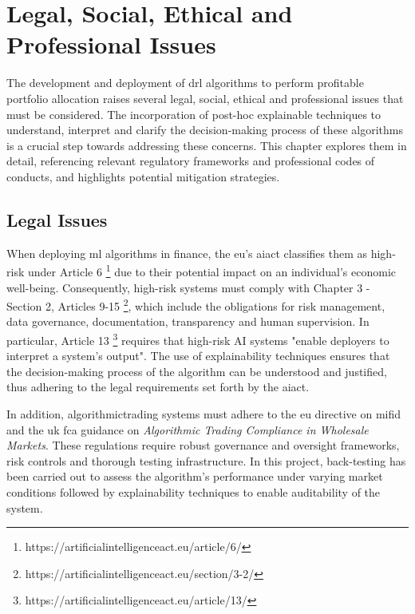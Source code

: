 \chapter{Legal, Social, Ethical and Professional Issues} \label{ch:issues}

The development and deployment of \acrfull{drl} algorithms to perform profitable portfolio allocation raises several legal, social, ethical and professional issues that must be considered. The incorporation of post-hoc explainable techniques to understand, interpret and clarify the decision-making process of these algorithms is a crucial step towards addressing these concerns. This chapter explores them in detail, referencing relevant regulatory frameworks and professional codes of conducts, and highlights potential mitigation strategies.

\section{Legal Issues} \label{sec:legal-issues}

When deploying \acrfull{ml} algorithms in finance, the \acrfull{eu}'s \acrfull{aiact} \cite{AIAct2024} classifies them as high-risk under Article 6 \footnote{https://artificialintelligenceact.eu/article/6/} due to their potential impact on an individual's economic well-being. Consequently, high-risk systems must comply with Chapter 3 - Section 2, Articles 9-15 \footnote{https://artificialintelligenceact.eu/section/3-2/}, which include the obligations for risk management, data governance, documentation, transparency and human supervision. In particular, Article 13 \footnote{https://artificialintelligenceact.eu/article/13/} requires that high-risk AI systems "enable deployers to interpret a system's output". The use of explainability techniques ensures that the decision-making process of the algorithm can be understood and justified, thus adhering to the legal requirements set forth by the \acrshort{aiact}.

In addition, \Gls{algorithmictrading} systems must adhere to the \acrlong{eu} directive on \acrfull{mifid} \cite{MiFIDII} and the \acrlong{uk} \acrfull{fca} guidance on \textit{Algorithmic Trading Compliance in Wholesale Markets}. These regulations require robust governance and oversight frameworks, risk controls and thorough testing infrastructure. In this project, back-testing has been carried out to assess the algorithm's performance under varying market conditions followed by explainability techniques to enable auditability of the system.

